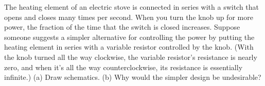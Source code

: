 The heating element of an electric stove is connected in
series with a switch that opens and closes many times per
second. When you turn the knob up for more power, the
fraction of the time that the switch is closed increases.
Suppose someone suggests a simpler alternative for
controlling the power by putting the heating element in
series with a variable resistor controlled by the knob.
(With the knob turned all the way clockwise, the variable
resistor's resistance is nearly zero, and when it's all the
way counterclockwise, its resistance is essentially
infinite.) (a) Draw schematics. (b) Why would the simpler
design be undesirable?
